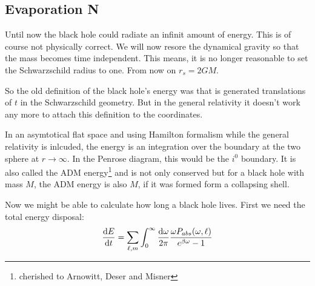 \subsection{Evaporation N}
	Until now the black hole could radiate an infinit amount of energy. This is of course not physically correct. We will now resore the dynamical gravity so that the mass becomes time independent. This means, it is no longer reasonable to set the Schwarzschild radius to one. From now on $r_s= 2GM$.	
	
	So the old definition of the black hole's energy was that is generated translations of $t$ in the Schwarzschild geometry. But in the general relativity it doesn't work any more to attach this definition to the coordinates.
	
	In an asymtotical flat space and using Hamilton formalism while the general relativity is inlcuded, the energy is an integration over the boundary at the two sphere at $r\rightarrow \infty$. In the Penrose diagram, this would be the $i^0$ boundary. It is also called the ADM energy\footnote{cherished to Arnowitt, Deser and Misner} and is not only conserved but for a black hole with mass $M$, the ADM energy is also $M$, if it was formed form a collapsing shell. 
	
	Now we might be able to calculate how long a black hole lives.
	First we need the total energy disposal:
	\begin{align}
		\frac{\mathrm{d} E}{\mathrm{d} t} =
		\sum_{\ell, m} \int_{0}^{\infty} \frac{\mathrm{d} \omega}{2 \pi}
		\frac{\omega P_{abs}(\omega,\ell)}{e^{\beta \omega} - 1}
	\end{align}
			

